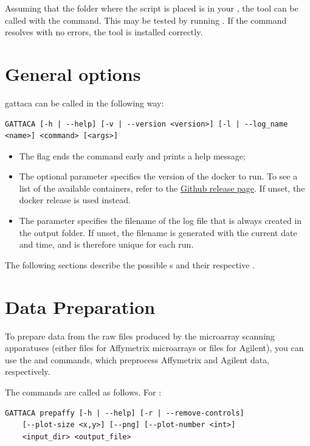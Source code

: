 Assuming that the folder where the script is placed is in your , the tool can be called with the  command. This may be tested by running . If the command resolves with no errors, the tool is installed correctly.

\section{General options}
\gls{gattaca} can be called in the following way:
\begin{lstlisting}[style=ShellStyle]
GATTACA [-h | --help] [-v | --version <version>] [-l | --log_name <name>] <command> [<args>]
\end{lstlisting}

\begin{itemize}
    \item The  flag ends the command early and prints a help message;
    \item The  optional parameter specifies the version of the docker to run. To see a list of the available containers, refer to the \href{https://github.com/Feat-FeAR/GATTACA/releases}{Github release page}. If unset, the  docker release is used instead.
    \item The  parameter specifies the filename of the log file that is always created in the output folder. If unset, the filename is generated with the current date and time, and is therefore unique for each run.
\end{itemize}

The following sections describe the possible s and their respective .

\section{Data Preparation}

To prepare data from the raw files produced by the microarray scanning apparatuses (either  files for Affymetrix microarrays or  files for Agilent), you can use the  and  commands, which preprocess Affymetrix and Agilent data, respectively.

The commands are called as follows. For :
\begin{lstlisting}[style=ShellStyle]
GATTACA prepaffy [-h | --help] [-r | --remove-controls]
    [--plot-size <x,y>] [--png] [--plot-number <int>]
    <input_dir> <output_file>
\end{lstlisting}

